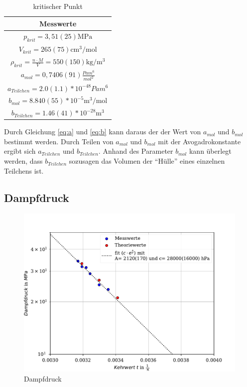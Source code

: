 \documentclass[11pt, a4paper]{article}
\begin{document}
    \begin{table}[h]
        \centering
        \begin{tabular}{c}
            Messwerte \\ \hline
            $p_{krit} = 3,51(25) \si{\mega\pascal}$ \\
            $V_{krit} =265(75) \si{\centi\metre\cubed\per\mole}$ \\
            $\rho_{krit} = \frac{n \cdot M}{V} = 550(150) \si{\kilogram \per \meter \cubed}$ \\
            $a_{mol} = 0,7406(91) \frac{Pa m^6}{mol^2}$ \\
            $a_{Teilchen} = 2.0(1.1)*10^{-48} Pa m^6$ \\
            $b_{mol} = 8.840(55)*10^{-5}\si{\cubic\metre\per\mol}$\\
            $b_{Teilchen} = 1.46(41)*10^{-28} \si{\cubic\metre}$
        \end{tabular}
        \caption{kritischer Punkt}
        \label{tab:krit}
    \end{table}
    Durch Gleichung \ref{eq:a} und \ref{eq:b} kann daraus der der Wert von $a_{mol}$ und $b_{mol}$ bestimmt werden. Durch Teilen
    von $a_{mol}$ und $b_{mol}$ mit der Avogadrokonstante ergibt sich $a_{Teilchen}$ und $b_{Teilchen}$.
    Anhand des Parameter $b_{mol}$ kann überlegt werden, dass $b_{Teilchen}$ sozusagen das Volumen der ``Hülle'' eines einzelnen Teilchens ist.
    \subsection{Dampfdruck}
    \begin{figure}
        \centering
        \includegraphics[width=\textwidth]{./Plots/dampf.pdf}

        \caption{Dampfdruck}
        \label{fig:dampf}
    \end{figure}
\end{document}

